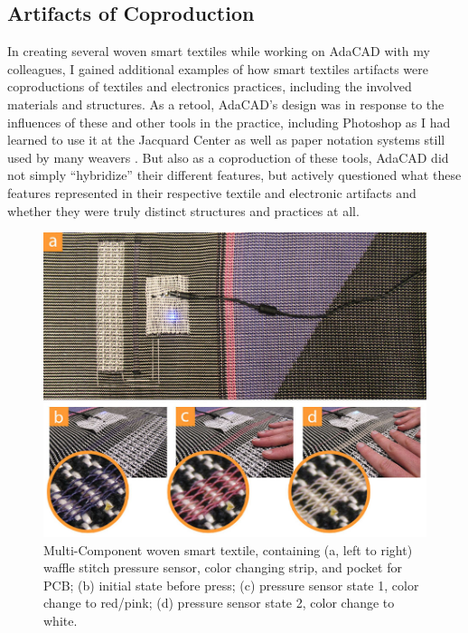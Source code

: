 \subsection{Artifacts of Coproduction}

In creating several woven smart textiles while working on AdaCAD with my colleagues, I gained additional examples of how smart textiles artifacts were coproductions of textiles and electronics practices, including the involved materials and structures. As a retool, AdaCAD's design was in response to the influences of these and other tools in the practice, including Photoshop as I had learned to use it at the Jacquard Center as well as paper notation systems still used by many weavers \cite{chandler_learning_2009}. But also as a coproduction of these tools, AdaCAD did not simply ``hybridize'' their different features, but actively questioned what these features represented in their respective textile and electronic artifacts and whether they were truly distinct structures and practices at all. 


\begin{figure}[h]
  \centering
  \includegraphics[width=0.6\linewidth]{figs/AdaCAD_multicomp.jpg}
  \caption[A multi-component woven e-textile.]{Multi-Component woven smart textile, containing (a, left to right) waffle stitch pressure sensor, color changing strip, and pocket for PCB; (b) initial state before press; (c) pressure sensor state 1, color change to red/pink; (d) pressure sensor state 2, color change to white.
  }
  \label{fig:multicomp-weave}
\end{figure}


